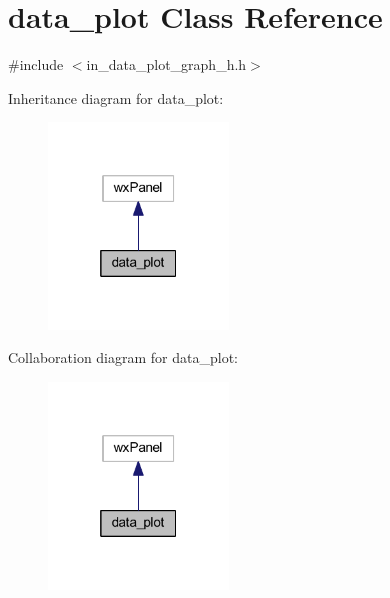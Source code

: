 \section{data\+\_\+plot Class Reference}
\label{classdata__plot}


{\ttfamily \#include $<$in\+\_\+data\+\_\+plot\+\_\+graph\+\_\+h.\+h$>$}



Inheritance diagram for data\+\_\+plot\+:\nopagebreak
\begin{figure}[H]
\begin{center}
\leavevmode
\includegraphics[width=136pt]{classdata__plot__inherit__graph}
\end{center}
\end{figure}


Collaboration diagram for data\+\_\+plot\+:\nopagebreak
\begin{figure}[H]
\begin{center}
\leavevmode
\includegraphics[width=136pt]{classdata__plot__coll__graph}
\end{center}
\end{figure}
